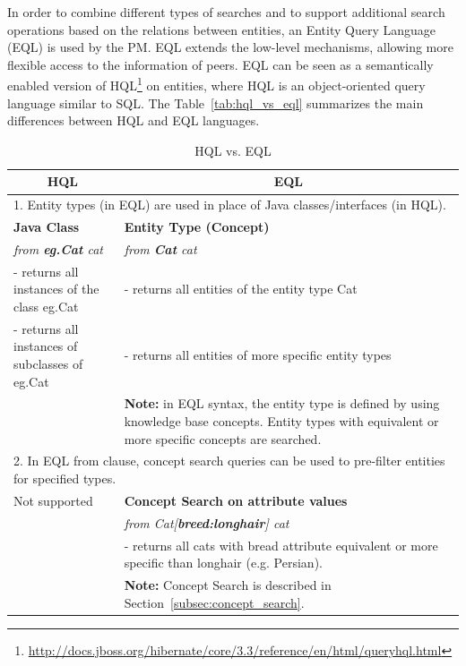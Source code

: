 In order to combine different types of searches and to support additional search operations based on the relations between entities, an Entity Query Language (EQL) is used by the PM. EQL extends the low-level mechanisms, allowing more flexible access to the information of peers. EQL can be seen as a semantically enabled version of HQL\footnote{\url{http://docs.jboss.org/hibernate/core/3.3/reference/en/html/queryhql.html}} on entities, where HQL is an object-oriented query language similar to SQL. The Table~\ref{tab:hql_vs_eql} summarizes the main differences between HQL and EQL languages. 
\begin{table}[ht]
\small
\centering
\caption{HQL vs. EQL}
\begin{tabularx}{\linewidth}{|X|X|}
\hline
\multicolumn{1}{|c|}{\textbf{HQL}} & \multicolumn{1}{c|}{\textbf{EQL}} \\ 
\hline

\multicolumn{2}{|p{0.9\linewidth}|}{1. Entity types (in EQL) are used in place of Java classes/interfaces (in HQL).} \\
\hline
\textbf{Java Class} & \textbf{Entity Type (Concept)} \\
\hdashline
\emph{from \textbf{eg.Cat} cat} & \emph{from \textbf{Cat} cat} \\
- returns all instances of the class eg.Cat & - returns all entities of the entity type Cat \\
- returns all instances of subclasses of eg.Cat & - returns all entities of more specific entity types \\
 & \textbf{Note:} in EQL syntax, the entity type is defined by using knowledge base concepts. Entity types with equivalent or more specific concepts are searched. \\
 \hline
 
\multicolumn{2}{|p{0.96\linewidth}|}{2. In EQL from clause, concept search queries can be used to pre-filter entities for specified types.} \\
\hline
Not supported & \textbf{Concept Search on attribute values} \\
\hdashline
 & \emph{from Cat[\textbf{breed:longhair}] cat} \\
 & - returns all cats with bread attribute equivalent or more specific than longhair (e.g. Persian). \\
 & \textbf{Note:} Concept Search is described in Section~\ref{subsec:concept_search}. \\
 \hline


\end{tabularx}
\end{table}
